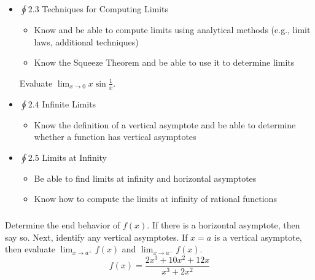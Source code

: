 \documentclass[14pt]{beamer}
\begin{document}
\begin{frame}
\begin{itemize}
\item $\oint 2.3$ Techniques for Computing Limits
	\begin{itemize}
	\item Know and be able to compute limits using analytical methods (e.g., limit laws, additional techniques)
	\item Know the Squeeze Theorem and be able to use it to determine limits
	\end{itemize}
	
\vspace{1pc}
\begin{ex} Evaluate $\displaystyle\lim_{x\to 0}x\sin{\frac{1}{x}}$. \end{ex}	
\end{itemize}	
\end{frame}

\begin{frame}
\begin{itemize}
\item $\oint 2.4$ Infinite Limits
	\begin{itemize}
	\item Know the definition of a vertical asymptote  and be able to determine whether a function has vertical asymptotes 
	\end{itemize}
\item $\oint 2.5$ Limits at Infinity
	\begin{itemize}
	\item Be able to find limits at infinity and horizontal asymptotes 
	\item Know how to compute the limits at infinity of rational functions
	\end{itemize}
\end{itemize}
\end{frame}

\begin{frame}
\frametitle{}
\begin{ex} Determine the end behavior of $f(x)$.  If there is a horizontal asymptote, then say so.  Next, identify any vertical asymptotes.  If $x=a$ is a vertical asymptote, then evaluate $\displaystyle\lim_{x\to a^+}f(x)$ and $\displaystyle\lim_{x\to a^-}f(x)$.
\[f(x)=\frac{2x^3+10x^2+12x}{x^3+2x^2}\]
\end{ex}
\end{frame}
\end{document}
